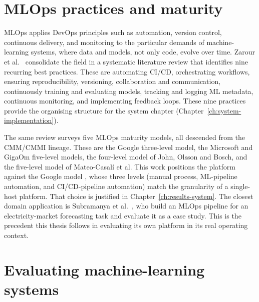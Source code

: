 \section{MLOps practices and maturity}
\label{sec:bg-mlops}

MLOps applies DevOps principles such as automation, version control, continuous
delivery, and monitoring to the particular demands of machine-learning
systems, where data and models, not only code, evolve over time. Zarour et al.\
\cite{zarour2025} consolidate the field in a systematic literature review that
identifies nine recurring best practices. These are automating CI/CD, orchestrating
workflows, ensuring reproducibility, versioning, collaboration and
communication, continuously training and evaluating models, tracking and logging
ML metadata, continuous monitoring, and implementing feedback loops. These nine
practices provide the organising structure for the system chapter
(Chapter~\ref{ch:system-implementation}).

The same review surveys five MLOps maturity models, all descended from the
CMM/CMMI lineage. These are the Google three-level model, the Microsoft and GigaOm
five-level models, the four-level model of John, Olsson and Bosch, and the
five-level model of Mateo-Casal\'i et al. This work positions the platform
against the Google model \cite{google_mlops_maturity}, whose three levels (manual
process, ML-pipeline automation, and CI/CD-pipeline automation) match the
granularity of a single-host platform. That choice is justified in
Chapter~\ref{ch:results-system}. The closest domain application is Subramanya et
al.\ \cite{subramanya2022devops2mlops}, who build an MLOps pipeline for an
electricity-market forecasting task and evaluate it as a case study. This is the
precedent this thesis follows in evaluating its own platform in its real
operating context.

\section{Evaluating machine-learning systems}
\label{sec:bg-eval}

